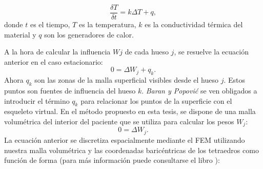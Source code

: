 




\begin{equation}
\label{diffusion}
 \frac{\delta T}{ \delta t} = k \Delta T + q,
\end{equation}
%
donde $t$ es el tiempo, $T$ es la temperatura, $k$ es la conductividad térmica del material
y $q$ son los generadores de calor.

A la hora de calcular la influencia $Wj$ de cada hueso $j$, se resuelve la ecuación anterior en el caso estacionario: 
\begin{equation}
\label{diffusion1}
 0 =  \Delta W_j +  q_{k}.
\end{equation}
Ahora $q_{k}$ son las zonas de la malla superficial visibles desde el hueso $j$. Estos puntos son fuentes de influencia del hueso $k$. \emph{Baran y Popovi\'{c}} se ven obligados a introducir el término $q_{k}$ para relacionar los puntos de la superficie con el esqueleto virtual. 
En el método propuesto en esta tesis, se dispone de una malla volumétrica del interior del paciente que se utiliza para calcular los pesos $W_j$:  
\begin{equation}
\label{diffusion2}
 0 =  \Delta W_j.
\end{equation}
La ecuación anterior se discretiza espacialmente mediante el \ac{FEM} utilizando nuestra malla volumétrica y las coordenadas baricéntricas de los tetraedros como función de forma (para más información puede consultarse el libro \cite{Lewis2004}):  

